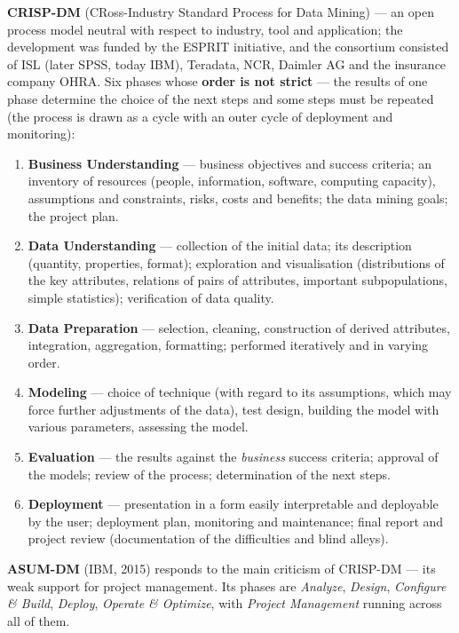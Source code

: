 \documentclass[11pt,a4paper]{article}
\theoremstyle{definition}
\begin{document}
\textbf{CRISP-DM} (CRoss-Industry Standard Process for Data Mining) --- an open process model
neutral with respect to industry, tool and application; the development was funded by the ESPRIT
initiative, and the consortium consisted of ISL (later SPSS, today IBM), Teradata, NCR,
Daimler AG and the insurance company OHRA. Six phases whose \textbf{order is not strict} ---
the results of one phase determine the choice of the next steps and some steps must be repeated
(the process is drawn as a cycle with an outer cycle of deployment and monitoring):

\begin{enumerate}
\item \textbf{Business Understanding} --- business objectives and success criteria; an inventory
      of resources (people, information, software, computing capacity), assumptions and
      constraints, risks, costs and benefits; the data mining goals; the project plan.
\item \textbf{Data Understanding} --- collection of the initial data; its description (quantity,
      properties, format); exploration and visualisation (distributions of the key attributes,
      relations of pairs of attributes, important subpopulations, simple statistics);
      verification of data quality.
\item \textbf{Data Preparation} --- selection, cleaning, construction of derived attributes,
      integration, aggregation, formatting; performed iteratively and in varying order.
\item \textbf{Modeling} --- choice of technique (with regard to its assumptions, which may force
      further adjustments of the data), test design, building the model with various parameters,
      assessing the model.
\item \textbf{Evaluation} --- the results against the \emph{business} success criteria; approval
      of the models; review of the process; determination of the next steps.
\item \textbf{Deployment} --- presentation in a form easily interpretable and deployable by the
      user; deployment plan, monitoring and maintenance; final report and project review
      (documentation of the difficulties and blind alleys).
\end{enumerate}

\textbf{ASUM-DM} (IBM, 2015) responds to the main criticism of CRISP-DM --- its weak support for
project management. Its phases are \emph{Analyze}, \emph{Design}, \emph{Configure \& Build},
\emph{Deploy}, \emph{Operate \& Optimize}, with \emph{Project Management} running across all of
them.
\end{document}
